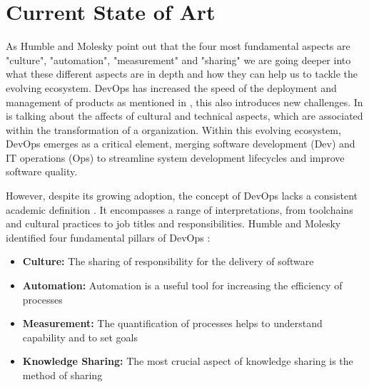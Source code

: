 
\chapter{Current State of Art}

\label{Chapter2} %

As Humble and Molesky \cite{HumbleMolesky2011} point out that the four most fundamental aspects are "culture", "automation", "measurement" and "sharing" we are going deeper into what these different aspects are in depth and how they can help us to tackle the evolving ecosystem. DevOps has increased the speed of the deployment and management of products as mentioned in \cite{Zhu2016DevOps}, this also introduces new challenges. In \cite{Zhu2016DevOps} is talking about the affects of cultural and technical aspects, which are associated within the transformation of a organization.
Within this evolving ecosystem, DevOps emerges as a critical element, merging software development (Dev) and IT operations (Ops) to streamline system development lifecycles and improve software quality.

However, despite its growing adoption, the concept of DevOps lacks a consistent academic definition \cite{jabbari2016devops}. It encompasses a range of interpretations, from toolchains and cultural practices to job titles and responsibilities. Humble and Molesky identified four fundamental pillars of DevOps \cite{HumbleMolesky2011}:

\begin{itemize}
    \item \textbf{Culture:} The sharing of responsibility for the delivery of software
    \item \textbf{Automation:} Automation is a useful tool for increasing the efficiency of processes
    \item \textbf{Measurement:} The quantification of processes helps to understand capability and to set goals
    \item \textbf{Knowledge Sharing:} The most crucial aspect of knowledge sharing is the method of sharing
\end{itemize}


